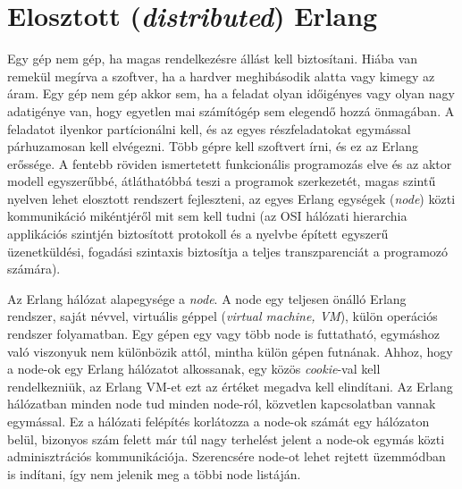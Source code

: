 \documentclass[12pt, a4paper, oneside]{book}
\begin{document}
\section{Elosztott (\emph{distributed}) Erlang}
Egy gép nem gép, ha magas rendelkezésre állást kell biztosítani. Hiába van
remekül megírva a szoftver, ha a hardver meghibásodik alatta vagy kimegy az
áram. Egy gép nem gép akkor sem, ha a feladat olyan időigényes vagy olyan nagy
adatigénye van, hogy egyetlen mai számítógép sem elegendő hozzá önmagában. A
feladatot ilyenkor partícionálni kell, és az egyes részfeladatokat egymással
párhuzamosan kell elvégezni. Több gépre kell szoftvert írni, és ez az Erlang
erőssége. A fentebb röviden ismertetett funkcionális programozás elve és az
aktor modell egyszerűbbé, átláthatóbbá teszi a programok szerkezetét, magas
szintű nyelven lehet elosztott rendszert fejleszteni, az egyes Erlang egységek
(\emph{node}) közti kommunikáció mikéntjéről mit sem kell tudni (az OSI
hálózati hierarchia applikációs szintjén biztosított protokoll és a nyelvbe
épített egyszerű üzenetküldési, fogadási szintaxis biztosítja a teljes
transzparenciát a programozó számára).

Az Erlang hálózat alapegysége a \emph{node}. A node egy teljesen önálló Erlang
rendszer, saját névvel, virtuális géppel (\emph{virtual machine, VM}), külön
operációs rendszer folyamatban. Egy gépen egy vagy több node is futtatható,
egymáshoz való viszonyuk nem különbözik attól, mintha külön gépen futnának.
Ahhoz, hogy a node-ok egy Erlang hálózatot alkossanak, egy közös
\emph{cookie}-val kell rendelkezniük, az Erlang VM-et ezt az értéket megadva
kell elindítani. Az Erlang hálózatban minden node tud minden node-ról,
közvetlen kapcsolatban vannak egymással. Ez a hálózati felépítés korlátozza a
node-ok számát egy hálózaton belül, bizonyos szám felett már túl nagy terhelést
jelent a node-ok egymás közti adminisztrációs kommunikációja. Szerencsére node-ot lehet
rejtett üzemmódban is indítani, így nem jelenik meg a többi node listáján.
\end{document}
